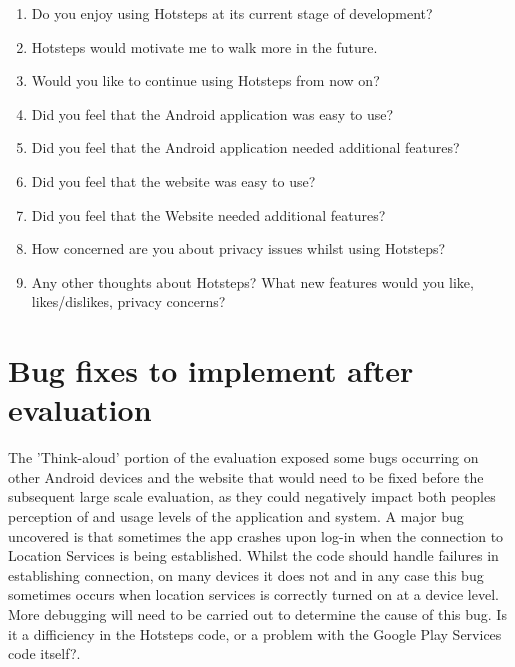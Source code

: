 \documentclass{l4proj}
\begin{document}
\begin{enumerate}

\item{Do you enjoy using Hotsteps at its current stage of development?}

\item{Hotsteps would motivate me to walk more in the future.}

\item{Would you like to continue using Hotsteps from now on?}

\item{Did you feel that the Android application was easy to use?}

\item{Did you feel that the Android application needed additional features?}

\item{Did you feel that the website was easy to use?}

\item{Did you feel that the Website needed additional features?}

\item{How concerned are you about privacy issues whilst using Hotsteps?}

\item{Any other thoughts about Hotsteps? What new features would you like, likes/dislikes, privacy concerns?}

\end{enumerate}

\section{Bug fixes to implement after evaluation}

The 'Think-aloud' portion of the evaluation exposed some bugs occurring on other Android devices and the website that would need to be fixed before the subsequent large scale evaluation, as they could negatively impact both peoples perception of and usage levels of the application and system. A major bug uncovered is that sometimes the app crashes upon log-in when the connection to Location Services is being established. Whilst the code should handle failures in establishing connection, on many devices it does not and in any case this bug sometimes occurs when location services is correctly turned on at a device level. More debugging will need to be carried out to determine the cause of this bug. Is it a difficiency in the Hotsteps code, or a problem with the Google Play Services code itself?.
\end{document}
